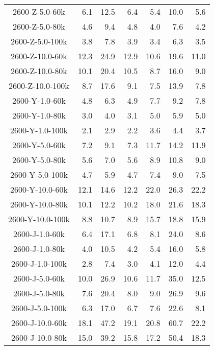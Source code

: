 \begin{longtable}{crrrrrr}
      2600-Z-5.0-60k   &   6.1 &  12.5 &   6.4 &   5.4 &  10.0 &   5.6 \\
      2600-Z-5.0-80k   &   4.6 &   9.4 &   4.8 &   4.0 &   7.6 &   4.2 \\
      2600-Z-5.0-100k  &   3.8 &   7.8 &   3.9 &   3.4 &   6.3 &   3.5 \\
      2600-Z-10.0-60k  &  12.3 &  24.9 &  12.9 &  10.6 &  19.6 &  11.0 \\
      2600-Z-10.0-80k  &  10.1 &  20.4 &  10.5 &   8.7 &  16.0 &   9.0 \\
      2600-Z-10.0-100k &   8.7 &  17.6 &   9.1 &   7.5 &  13.9 &   7.8 \\
      2600-Y-1.0-60k   &   4.8 &   6.3 &   4.9 &   7.7 &   9.2 &   7.8 \\
      2600-Y-1.0-80k   &   3.0 &   4.0 &   3.1 &   5.0 &   5.9 &   5.0 \\
      2600-Y-1.0-100k  &   2.1 &   2.9 &   2.2 &   3.6 &   4.4 &   3.7 \\
      2600-Y-5.0-60k   &   7.2 &   9.1 &   7.3 &  11.7 &  14.2 &  11.9 \\
      2600-Y-5.0-80k   &   5.6 &   7.0 &   5.6 &   8.9 &  10.8 &   9.0 \\
      2600-Y-5.0-100k  &   4.7 &   5.9 &   4.7 &   7.4 &   9.0 &   7.5 \\
      2600-Y-10.0-60k  &  12.1 &  14.6 &  12.2 &  22.0 &  26.3 &  22.2 \\
      2600-Y-10.0-80k  &  10.1 &  12.2 &  10.2 &  18.0 &  21.6 &  18.3 \\
      2600-Y-10.0-100k &   8.8 &  10.7 &   8.9 &  15.7 &  18.8 &  15.9 \\
      2600-J-1.0-60k   &   6.4 &  17.1 &   6.8 &   8.1 &  24.0 &   8.6 \\
      2600-J-1.0-80k   &   4.0 &  10.5 &   4.2 &   5.4 &  16.0 &   5.8 \\
      2600-J-1.0-100k  &   2.8 &   7.4 &   3.0 &   4.1 &  12.0 &   4.4 \\
      2600-J-5.0-60k   &  10.0 &  26.9 &  10.6 &  11.7 &  35.0 &  12.5 \\
      2600-J-5.0-80k   &   7.6 &  20.4 &   8.0 &   9.0 &  26.9 &   9.6 \\
      2600-J-5.0-100k  &   6.3 &  17.0 &   6.7 &   7.6 &  22.6 &   8.1 \\
      2600-J-10.0-60k  &  18.1 &  47.2 &  19.1 &  20.8 &  60.7 &  22.2 \\
      2600-J-10.0-80k  &  15.0 &  39.2 &  15.8 &  17.2 &  50.4 &  18.3 \\

\end{longtable}
